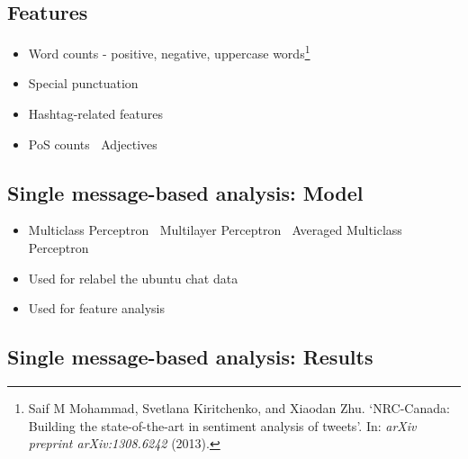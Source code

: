 \documentclass[
paper=128mm:96mm, %
fontsize=11pt, %
pagesize, %
parskip=half-, %
]{scrartcl} %
\newcommand{\red}[1]{\textit{\color{red}{#1}}}
\theoremstyle{mythmstyle} %
\begin{document}
\clearpage

\clearpage


\subsection*{Features}	

\begin{itemize}
\item Word counts - positive, negative, uppercase words\footnote{Saif M Mohammad, Svetlana Kiritchenko, and Xiaodan Zhu. `NRC-Canada: Building the state-of-the-art in sentiment analysis of tweets'. In: \textit{arXiv preprint arXiv:1308.6242} (2013). } 

\nocite{*} 
\printbibliography


\item Special punctuation
\item Hashtag-related features
\item PoS counts
\subitem \textbullet $\:$ Adjectives
\end{itemize}


\clearpage


\subsection*{Single message-based analysis: Model}


\begin{itemize}

\item Multiclass Perceptron
\subitem \textbullet $\:$ Multilayer Perceptron
\subitem \textbullet $\:$ Averaged Multiclass Perceptron

\item Used for relabel the ubuntu chat data
\item Used for feature analysis
\end{itemize}

\clearpage


\subsection*{Single message-based analysis: Results}
\end{document}
